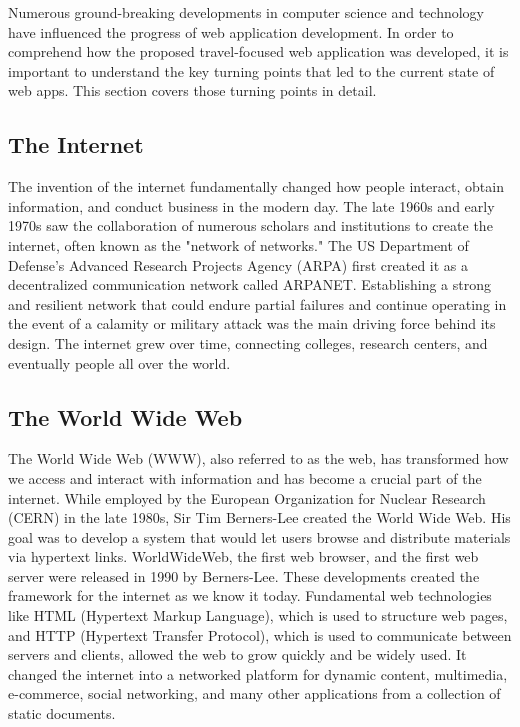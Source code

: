 \par Numerous ground-breaking developments in computer science and technology have influenced the progress of web application development. In order to comprehend how the proposed travel-focused web application was developed, it is important to understand the key turning points that led to the current state of web apps. This section covers those turning points in detail.


\subsection{The Internet}

\par The invention of the internet fundamentally changed how people interact, obtain information, and conduct business in the modern day. The late 1960s and early 1970s saw the collaboration of numerous scholars and institutions to create the internet, often known as the "network of networks." The US Department of Defense's Advanced Research Projects Agency (ARPA) first created it as a decentralized communication network called ARPANET. Establishing a strong and resilient network that could endure partial failures and continue operating in the event of a calamity or military attack was the main driving force behind its design. The internet grew over time, connecting colleges, research centers, and eventually people all over the world. \cite{Cerf1974}

\subsection{The World Wide Web}

\par The World Wide Web (WWW), also referred to as the web, has transformed how we access and interact with information and has become a crucial part of the internet. While employed by the European Organization for Nuclear Research (CERN) in the late 1980s, Sir Tim Berners-Lee created the World Wide Web. His goal was to develop a system that would let users browse and distribute materials via hypertext links. WorldWideWeb, the first web browser, and the first web server were released in 1990 by Berners-Lee. These developments created the framework for the internet as we know it today. Fundamental web technologies like HTML (Hypertext Markup Language), which is used to structure web pages, and HTTP (Hypertext Transfer Protocol), which is used to communicate between servers and clients, allowed the web to grow quickly and be widely used. It changed the internet into a networked platform for dynamic content, multimedia, e-commerce, social networking, and many other applications from a collection of static documents. \cite{Berners1999}


